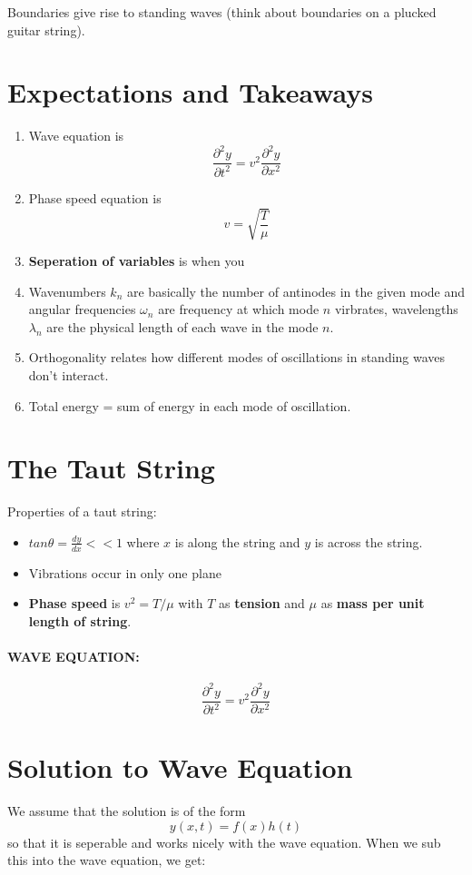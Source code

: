 \documentclass[a4paper,12pt]{report}
\begin{document}
Boundaries give rise to standing waves (think about boundaries on a plucked guitar string).

\section{Expectations and Takeaways}
\begin{enumerate}
\item Wave equation is $$\frac{\partial^2 y}{\partial t^2} = v^2\frac{\partial^2y}{\partial x^2}$$
\item Phase speed equation is $$v = \sqrt{\frac{T}{\mu}}$$
\item \textbf{Seperation of variables} is when you
\item Wavenumbers $k_n$ are basically the number of antinodes in the given mode and angular frequencies $\omega_n$ are frequency at which mode $n$ virbrates, 
wavelengths $\lambda_n$ are the physical length of each wave in the mode $n$.
\item Orthogonality relates how different modes of oscillations in standing waves don't interact.
\item Total energy = sum of energy in each mode of oscillation.
\end{enumerate}

\section{The Taut String}
Properties of a taut string:
\begin{itemize}
\item $tan\theta = \frac{dy}{dx} << 1$ where $x$ is along the string and $y$ is across the string.
\item Vibrations occur in only one plane
\item \textbf{Phase speed } is $v^2 = T/\mu$ with $T$ as \textbf{tension} and $\mu$ as \textbf{mass per unit length of string}.
\end{itemize}

\paragraph{WAVE EQUATION: } $$\frac{\partial^2 y}{\partial t^2} = v^2 \frac{\partial^2y}{\partial x^2}$$

\section{Solution to Wave Equation}
We assume that the solution is of the form $$y(x, t) = f(x)h(t)$$ so that it is seperable and works nicely 
with the wave equation. When we sub this into the wave equation, we get:
\end{document}
